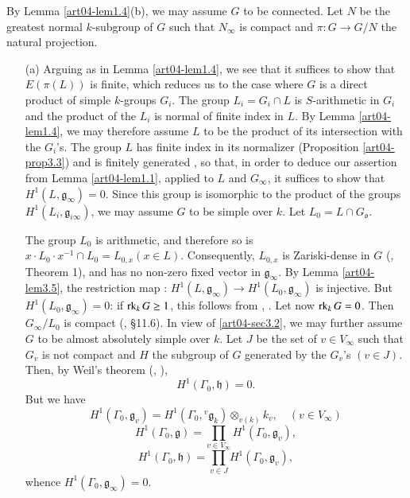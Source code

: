 By Lemma \ref{art04-lem1.4}(b), we may assume $G$ to be connected. Let $N$ be the greatest normal $k$-subgroup of $G$ such that $N_{\infty}$ is compact and $\pi:G\to G/N$ the natural projection.
\begin{itemize}
\item[(a)] Arguing as in Lemma \ref{art04-lem1.4}, we see that it suffices to show that $E(\pi(L))$ is finite, which reduces us to the case where $G$ is a direct product of simple $k$-groups $G_{i}$. The group $L_{i}=G_{i}\cap L$ is $S$-arithmetic in $G_{i}$ and the product of the $L_{i}$ is normal of finite index in $L$. By Lemma \ref{art04-lem1.4}, we may therefore assume $L$ to be the product of its intersection with the $G_{i}$'s. The group $L$ has finite index in its normalizer (Proposition \ref{art04-prop3.3}) and is finitely generated \cite{art04-key17}, so that, in order to deduce our assertion from Lemma \ref{art04-lem1.1}, applied to $L$ and $G_{\infty}$, it suffices to show that $H^{1}(L,\mathfrak{g}_{\infty})=0$. Since this group is isomorphic to the product of the groups $H^{1}(L_{i},\mathfrak{g}_{i\infty})$, we may assume $G$ to be simple over $k$. Let $L_{0}=L\cap G_{\mathfrak{o}}$.

The group $L_{0}$ is arithmetic, and therefore so is $x\cdot L_{0}\cdot x^{-1}\cap L_{0}=L_{0,x}(x\in L)$. Consequently, $L_{0,x}$ is Zariski-dense in $G$ (\cite{art04-key6}, Theorem 1), and has no non-zero fixed vector in $\mathfrak{g}_{\infty}$. By Lemma \ref{art04-lem3.5}, the restriction map : $H^{1}(L,\mathfrak{g}_{\infty})\to H^{1}(L_{0},\mathfrak{g}_{\infty})$ is injective. But $H^{1}(L_{0},\mathfrak{g}_{\infty})=0$: if $\operatorname{\mathrm{rk}}_{k}G\geq 1$, this follows from \cite{art04-key25}, \cite{art04-key26}. Let now $\operatorname{\mathrm{rk}}_{k}G=0$. Then $G_{\infty}/L_{0}$ is compact (\cite{art04-key4}, \S11.6). In view of \ref{art04-sec3.2}, we may further assume $G$ to be almost absolutely simple over $k$. Let $J$ be the set of $v\in V_{\infty}$ such that $G_{v}$ is not compact and $H$ the subgroup of $G$ generated by the $G_{v}$'s $(v\in J)$. Then, by Weil's theorem (\cite{art04-key32}, \cite{art04-key33}),
\setcounter{equation}{0}
\begin{equation*}
H^{1}(\Gamma_{0},\mathfrak{h})=0.\tag{1}\label{art04-thm3.6-eq1}
\end{equation*}
But we have
\begin{equation*}
H^{1}(\Gamma_{0},\mathfrak{g}_{v})=H^{1}(\Gamma_{0},{}^{v}\mathfrak{g}_{k})\otimes_{v(k)}k_{v},\quad (v\in V_{\infty})\tag{2}\label{art04-thm3.6-eq2}
\end{equation*}
\begin{equation*}
H^{1}(\Gamma_{0},\mathfrak{g})=\prod\limits_{v\in V_{\infty}}H^{1}(\Gamma_{0},\mathfrak{g}_{v}),\tag{3}\label{art04-thm3.6-eq3}
\end{equation*}
\begin{equation*}
H^{1}(\Gamma_{0},\mathfrak{h})=\prod\limits_{v\in J}H^{1}(\Gamma_{0},\mathfrak{g}_{v}),\tag{4}\label{art04-thm3.6-eq4}
\end{equation*}
whence $H^{1}(\Gamma_{0},\mathfrak{g}_{\infty})=0$.


\end{itemize}
